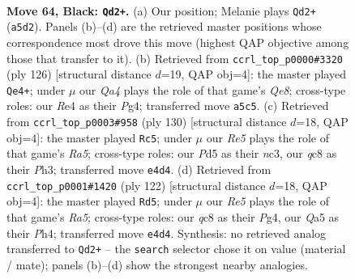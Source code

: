 \documentclass[11pt]{article}
\begin{document}
\clearpage

\begin{figure}[p]\centering
\begin{subfigure}{0.46\textwidth}\centering
\resizebox{\linewidth}{!}{%
\newchessgame
\chessboard[
  setfen={2Q5/8/5pk1/q2p4/4r3/6P1/6KP/8 b - - 9 64},
  showmover=false,
  pgfstyle=straightmove, color=movearrow, markmove={a5-d2}
]}
\caption{}
\end{subfigure}\hfill
\begin{subfigure}{0.46\textwidth}\centering
\resizebox{\linewidth}{!}{%
\newchessgame
\chessboard[
  setfen={4Q3/2q3pk/7p/8/6P1/7P/5PK1/8 w - - 11 64},
  showmover=false,
  pgfstyle=straightmove, color=movearrow, markmove={e8-e4}
]}
\caption{}
\end{subfigure}
\\[4pt]
\begin{subfigure}{0.46\textwidth}\centering
\resizebox{\linewidth}{!}{%
\newchessgame
\chessboard[
  setfen={8/5k2/4p1p1/R7/7p/2n4P/6P1/6K1 w - - 0 66},
  showmover=false,
  pgfstyle=straightmove, color=movearrow, markmove={a5-c5}
]}
\caption{}
\end{subfigure}\hfill
\begin{subfigure}{0.46\textwidth}\centering
\resizebox{\linewidth}{!}{%
\newchessgame
\chessboard[
  setfen={8/6pk/1r5p/R7/6PP/5P2/6K1/8 w - - 21 62},
  showmover=false,
  pgfstyle=straightmove, color=movearrow, markmove={a5-d5}
]}
\caption{}
\end{subfigure}
\caption{\textbf{Move 64, Black: \texttt{Qd2+}.} (a) Our position; Melanie plays \texttt{Qd2+} (\texttt{a5d2}). Panels (b)--(d) are the retrieved master positions whose correspondence most drove this move (highest QAP objective among those that transfer to it). (b) Retrieved from \texttt{ccrl\_top\_p0000\#3320} (ply 126) [structural distance $d$=19, QAP obj=4]: the master played \texttt{Qe4+}; under $\mu$ our \emph{Qa4} plays the role of that game's \emph{Qe8}; cross-type roles: our \emph{R}e4 as their \emph{P}g4; transferred move \texttt{a5c5}. (c) Retrieved from \texttt{ccrl\_top\_p0003\#958} (ply 130) [structural distance $d$=18, QAP obj=4]: the master played \texttt{Rc5}; under $\mu$ our \emph{Re5} plays the role of that game's \emph{Ra5}; cross-type roles: our \emph{P}d5 as their \emph{n}c3, our \emph{q}c8 as their \emph{P}h3; transferred move \texttt{e4d4}. (d) Retrieved from \texttt{ccrl\_top\_p0001\#1420} (ply 122) [structural distance $d$=18, QAP obj=4]: the master played \texttt{Rd5}; under $\mu$ our \emph{Re5} plays the role of that game's \emph{Ra5}; cross-type roles: our \emph{q}c8 as their \emph{P}g4, our \emph{Q}a5 as their \emph{P}h4; transferred move \texttt{e4d4}. Synthesis: no retrieved analog transferred to \texttt{Qd2+} -- the \texttt{search} selector chose it on value (material / mate); panels (b)--(d) show the strongest nearby analogies.}
\label{fig:thought-m127}
\end{figure}
\end{document}
